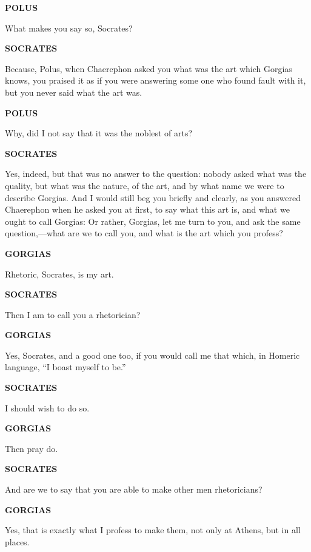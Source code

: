 \documentclass[11pt,letter]{article}
\begin{document}
\par \textbf{POLUS}
\par   What makes you say so, Socrates?

\par \textbf{SOCRATES}
\par   Because, Polus, when Chaerephon asked you what was the art which Gorgias knows, you praised it as if you were answering some one who found fault with it, but you never said what the art was.

\par \textbf{POLUS}
\par   Why, did I not say that it was the noblest of arts?

\par \textbf{SOCRATES}
\par   Yes, indeed, but that was no answer to the question:  nobody asked what was the quality, but what was the nature, of the art, and by what name we were to describe Gorgias. And I would still beg you briefly and clearly, as you answered Chaerephon when he asked you at first, to say what this art is, and what we ought to call Gorgias:  Or rather, Gorgias, let me turn to you, and ask the same question,—what are we to call you, and what is the art which you profess?

\par \textbf{GORGIAS}
\par   Rhetoric, Socrates, is my art.

\par \textbf{SOCRATES}
\par   Then I am to call you a rhetorician?

\par \textbf{GORGIAS}
\par   Yes, Socrates, and a good one too, if you would call me that which, in Homeric language, “I boast myself to be.”

\par \textbf{SOCRATES}
\par   I should wish to do so.

\par \textbf{GORGIAS}
\par   Then pray do.

\par \textbf{SOCRATES}
\par   And are we to say that you are able to make other men rhetoricians?

\par \textbf{GORGIAS}
\par   Yes, that is exactly what I profess to make them, not only at Athens, but in all places.
\end{document}
